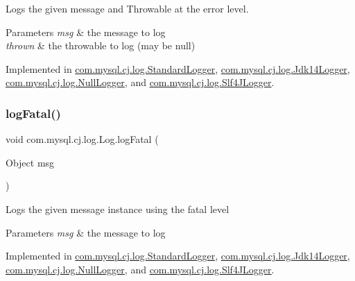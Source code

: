 Logs the given message and Throwable at the \textquotesingle{}error\textquotesingle{} level.


\begin{DoxyParams}{Parameters}
{\em msg} & the message to log \\
\hline
{\em thrown} & the throwable to log (may be null) \\
\hline
\end{DoxyParams}


Implemented in \mbox{\hyperlink{classcom_1_1mysql_1_1cj_1_1log_1_1_standard_logger_a536975e1d72a19baef92a859e27d2e7a}{com.\+mysql.\+cj.\+log.\+Standard\+Logger}}, \mbox{\hyperlink{classcom_1_1mysql_1_1cj_1_1log_1_1_jdk14_logger_ada15522843be28970a27cfb2892147d0}{com.\+mysql.\+cj.\+log.\+Jdk14\+Logger}}, \mbox{\hyperlink{classcom_1_1mysql_1_1cj_1_1log_1_1_null_logger_a5e2cc9bc22d59ed5f1531cb73b3b48c5}{com.\+mysql.\+cj.\+log.\+Null\+Logger}}, and \mbox{\hyperlink{classcom_1_1mysql_1_1cj_1_1log_1_1_slf4_j_logger_a30a623739677aa264670ff888fff2958}{com.\+mysql.\+cj.\+log.\+Slf4\+J\+Logger}}.

\mbox{\label{interfacecom_1_1mysql_1_1cj_1_1log_1_1_log_a4f36fdcde6b1c88a4f1ba25a70555e3f}} 
\subsubsection{\texorpdfstring{log\+Fatal()}{logFatal()}\hspace{0.1cm}{\footnotesize\ttfamily [1/2]}}
{\footnotesize\ttfamily void com.\+mysql.\+cj.\+log.\+Log.\+log\+Fatal (\begin{DoxyParamCaption}\item[{Object}]{msg }\end{DoxyParamCaption})}

Logs the given message instance using the \textquotesingle{}fatal\textquotesingle{} level


\begin{DoxyParams}{Parameters}
{\em msg} & the message to log \\
\hline
\end{DoxyParams}


Implemented in \mbox{\hyperlink{classcom_1_1mysql_1_1cj_1_1log_1_1_standard_logger_af6f7c3848e7c6df645dd52b95b312aaa}{com.\+mysql.\+cj.\+log.\+Standard\+Logger}}, \mbox{\hyperlink{classcom_1_1mysql_1_1cj_1_1log_1_1_jdk14_logger_a6f21dd8deaa592dba6d0dcdca158ad8e}{com.\+mysql.\+cj.\+log.\+Jdk14\+Logger}}, \mbox{\hyperlink{classcom_1_1mysql_1_1cj_1_1log_1_1_null_logger_a68d852a1b707ebdbf2288d9e4a1c0335}{com.\+mysql.\+cj.\+log.\+Null\+Logger}}, and \mbox{\hyperlink{classcom_1_1mysql_1_1cj_1_1log_1_1_slf4_j_logger_a60d9438bd9dfae5451a25543e2d4584a}{com.\+mysql.\+cj.\+log.\+Slf4\+J\+Logger}}.

